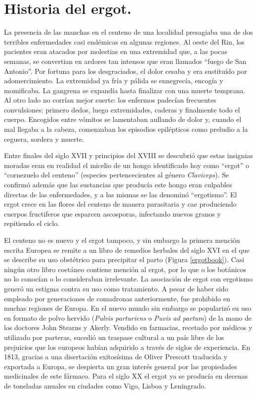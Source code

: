 \section{Historia del ergot.}

La presencia de las manchas en el centeno de una localidad presagiaba una de dos terribles enfermedades casi endémicas en algunas regiones. Al oeste del Rin, los pacientes eran atacados por molestias en una extremidad que, a las pocas semanas, se convertian en ardores tan intensos que eran llamados \enquote{fuego de San Antonio}. Por fortuna para los desgraciados, el dolor cesaba y era sustituído por adomercimiento. La extremidad ya fría y pálida se ennegrecía, encogía y momificaba. La gangrena se expandía hasta finalizar con una muerte temprana. Al otro lado no corrían mejor suerte: los enfermos padecían frecuentes convulsiones: primero dedos, luego extremidades, caderas y finalmente todo el cuerpo. Encogidos entre vómitos se lamentaban aullando de dolor y, cuando el mal llegaba a la cabeza, comenzaban los episodios epilépticos como preludio a la ceguera, sordera y muerte.

Entre finales del siglo XVII y principios del XVIII se descubrió que estas insignias moradas eran en realidad el micelio de un hongo identificado hoy como \enquote{ergot} o \enquote{cornezuelo del centeno} (especies pertencecientes al género \textit{Claviceps}). Se confirmó además que las sustancias que producía este hongo eran culpables directas de las enfermedades, y a las mismas se las denominó \enquote{ergotismo}. El ergot crece en las flores del centeno de manera parasitaria y cae produciendo cuerpos fructiferos que esparcen ascosporas, infectando nuevos granos y repitiendo el ciclo.

El centeno no es nuevo y el ergot tampoco, y sin embargo la primera mención escrita Europea se remite a un libro de remedios herbales del siglo XVI en el que se describe su uso obstétrico para precipitar el parto (Figura \ref{ergotbook}). Casi ningún otro libro coetáneo contiene mención al ergot, por lo que o los botánicos no lo conocían o lo consideraban irrelevante. La asociación de ergot con ergotismo generó un estigma contra su uso como tratamiento. A pesar de haber sido empleado por generaciones de comadronas anteriormente, fue prohibido en muchas regiones de Europa. En el nuevo mundo sin embargo se popularizó su uso en formato de polvo hervido (\textit{Pulvis parturiens} o \textit{Puvis ad partum}) de la mano de los doctores John Stearns y Akerly. Vendido en farmacias, recetado por médicos y utilizado por parteras, sucedió un traspase cultural a un país libre de los prejuicios que los europeos habían adquirido a través de siglos de experiencia. En 1813, gracias a una disertación exitosísima de Oliver Prescott traducida y exportada a Europa, se despierta un gran interés general por las propiedades medicinales de este fármaco. Para el siglo XX el ergot ya se producía en decenas de toneladas anuales en ciudades como Vigo, Lisboa y Leningrado. 

